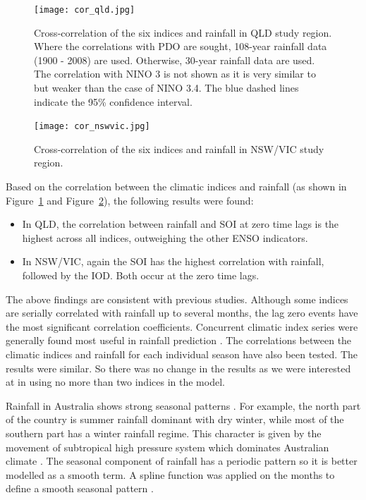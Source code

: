 \documentclass[draft,linenumbers]{agujournal}
\begin{document}
\begin{article}
\begin{figure}[h]
\centering
\texttt{[image: cor\_qld.jpg]}
 \caption{Cross-correlation of the six indices and rainfall in QLD study region. Where the correlations with PDO are sought, 108-year rainfall data (1900 - 2008) are used. Otherwise, 30-year rainfall data are used. The correlation with NINO 3 is not shown as it is very similar to but weaker than the case of NINO 3.4. The blue dashed lines indicate the 95\% confidence interval.}
  \label{fig:cor_rain_qld}
\end{figure}

\begin{figure}[htp]
\centering
\texttt{[image: cor\_nswvic.jpg]}
 \caption{Cross-correlation of the six indices and rainfall in NSW/VIC study region.}
  \label{fig:cor_rain_nsw}
\end{figure}


Based on the correlation between the climatic indices and rainfall (as shown in Figure~\ref{fig:cor_rain_qld} and Figure~\ref{fig:cor_rain_nsw}), the following results were found:
\begin{itemize}
  \setlength{\itemsep}{0cm}
  \setlength{\parskip}{0cm}
  \item In QLD, the correlation between rainfall and SOI at zero time lags is the highest across all indices, outweighing the other ENSO indicators. 
  \item In NSW/VIC, again the SOI has the highest correlation with rainfall, followed by the IOD. Both occur at the zero time lags. 
\end{itemize}
The above findings are consistent with previous studies. Although some indices are serially correlated with rainfall up to several months, the lag zero events have the most significant correlation coefficients. Concurrent climatic index series were generally found most useful in rainfall prediction \citep[e.g.][]{Risbey2009,Kamruzzaman2011}. The correlations between the climatic indices and rainfall for each individual season have also been tested. The results were similar. So there was no change in the results as we were interested at in using no more than two indices in the model. 


Rainfall in Australia shows strong seasonal patterns \citep{Holper2011,ABS2012}. For example, the north part of the country is summer rainfall dominant with dry winter, while most of the southern part has a winter rainfall regime. This character is given by the movement of subtropical high pressure system which dominates Australian climate \citep{BoM2012a}. The seasonal component of rainfall has a periodic pattern so it is better modelled as a smooth term. A spline function was applied on the months to define a smooth seasonal pattern \citep{Wood2011}. %


\end{article}
\end{document}
